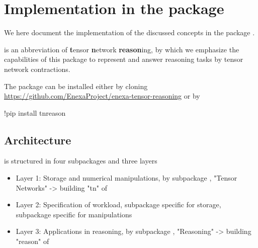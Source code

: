 \section{Implementation in the \tnreason package}\label{cha:implementation}

We here document the implementation of the discussed concepts in the \python package \tnreason.
 
\tnreason is an abbreviation of \textbf{t}ensor \textbf{n}etwork \textbf{reason}ing, by which we emphasize the capabilities of this package to represent and answer reasoning tasks by tensor network contractions. 

The package can be installed either by cloning \href{https://github.com/EnexaProject/enexa-tensor-reasoning}{https://github.com/EnexaProject/enexa-tensor-reasoning} or by
\begin{centeredcode}
	!pip install tnreason
\end{centeredcode}














\subsection{Architecture}

\tnreason is structured in four subpackages and three layers
\begin{itemize}
	\item Layer 1: Storage and numerical manipulations, by subpackage \spengine, "Tensor Networks" -> building "tn" of \tnreason
	\item Layer 2: Specification of workload, subpackage \spencoding specific for storage, subpackage \spalgorithms specific for manipulations
	\item Layer 3: Applications in reasoning, by subpackage \spknowledge, "Reasoning" -> building "reason" of \tnreason
\end{itemize}

